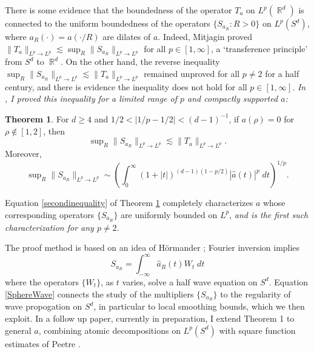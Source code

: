 \documentclass[11pt]{article}
\theoremstyle{definition}
\newtheorem{theorem}{Theorem}
\DeclareMathOperator{\RR}{\mathbb{R}}
\begin{document}
There is some evidence that the boundedness of the operator $T_a$ on $L^p(\RR^d)$ is connected to the uniform boundedness of the operators $\{ S_{a_R} : R > 0 \}$ on $L^p(S^d)$, where $a_R(\cdot) = a(\cdot / R)$ are dilates of $a$. Indeed, Mitjagin \cite{Mitjagin} proved $\| T_a \|_{L^p \to L^p} \lesssim \sup_R \| S_{a_R} \|_{L^p \to L^p}$ for all $p \in [1,\infty]$, a `transference principle' from $S^d$ to $\RR^d$. %
On the other hand, the reverse inequality $\sup_R \| S_{a_R} \|_{L^p \to L^p} \lesssim \| T_a \|_{L^p \to L^p}$ remained unproved for all $p \neq 2$ for a half century, and there is evidence the inequality does not hold for all $p \in [1,\infty]$. \emph{In \cite{DensonCharacterization}, I proved this inequality for a limited range of $p$ and compactly supported $a$:}

\begin{theorem} \label{characterization}
    For $d \geq 4$ and $1/2 < |1/p - 1/2| < (d-1)^{-1}$, if $a(\rho) = 0$ for $\rho \not \in [1,2]$, then
    \begin{equation}
        \sup\nolimits_R \| S_{a_R} \|_{L^p \to L^p} \lesssim \| T_a \|_{L^p \to L^p}.
    \end{equation}
    Moreover,
    \begin{equation} \label{secondinequality}
        \sup\nolimits_R \| S_{a_R} \|_{L^p \to L^p} \sim \left( \int_0^\infty ( 1 + |t| )^{(d-1)(1 - p/2)} | \widehat{a}(t) |^p\; dt \right)^{1/p}.
    \end{equation}
\end{theorem}

Equation \eqref{secondinequality} of Theorem \ref{characterization} completely characterizes $a$ whose corresponding operators $\{ S_{a_R} \}$ are uniformly bounded on $L^p$, \emph{and is the first such characterization for any $p \neq 2$.}

The proof method is based on an idea of H\"{o}rmander \cite{Hormander2}; Fourier inversion implies
%
\begin{equation} \label{SphereWave}
    S_{a_R} = \int_{-\infty}^\infty \widehat{a}_R(t) W_t\; dt
\end{equation}
%
where the operators $\{ W_t \}$, as $t$ varies, solve a half wave equation on $S^d$. Equation \eqref{SphereWave} connects the study of the multipliers $\{ S_{a_R} \}$ to the regularity of wave propogation on $S^d$, in particular to local smoothing bounds, which we then exploit. In a follow up paper, currently in preparation, I extend Theorem 1 to general $a$, combining atomic decompositions on $L^p(S^d)$ with square function estimates of Peetre \cite{Peetre}.
\end{document}
